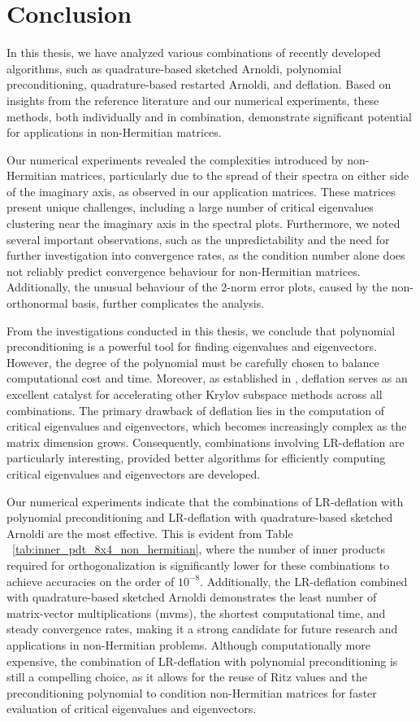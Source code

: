 \chapter{Conclusion}

In this thesis, we have analyzed various combinations of recently developed algorithms, such as quadrature-based sketched Arnoldi, polynomial preconditioning, quadrature-based restarted Arnoldi, and deflation. Based on insights from the reference literature and our numerical experiments, these methods, both individually and in combination, demonstrate significant potential for applications in non-Hermitian matrices.

Our numerical experiments revealed the complexities introduced by non-Hermitian matrices, particularly due to the spread of their spectra on either side of the imaginary axis, as observed in our application matrices. These matrices present unique challenges, including a large number of critical eigenvalues clustering near the imaginary axis in the spectral plots. Furthermore, we noted several important observations, such as the unpredictability and the need for further investigation into convergence rates, as the condition number alone does not reliably predict convergence behaviour for non-Hermitian matrices. Additionally, the unusual behaviour of the 2-norm error plots, caused by the non-orthonormal basis, further complicates the analysis.

From the investigations conducted in this thesis, we conclude that polynomial preconditioning is a powerful tool for finding eigenvalues and eigenvectors. However, the degree of the polynomial must be carefully chosen to balance computational cost and time. Moreover, as established in \cite{4}, deflation serves as an excellent catalyst for accelerating other Krylov subspace methods across all combinations. The primary drawback of deflation lies in the computation of critical eigenvalues and eigenvectors, which becomes increasingly complex as the matrix dimension grows. Consequently, combinations involving LR-deflation are particularly interesting, provided better algorithms for efficiently computing critical eigenvalues and eigenvectors are developed.

Our numerical experiments indicate that the combinations of LR-deflation with polynomial preconditioning and LR-deflation with quadrature-based sketched Arnoldi are the most effective. This is evident from Table ~\ref{tab:inner_pdt_8x4_non_hermitian}, where the number of inner products required for orthogonalization is significantly lower for these combinations to achieve accuracies on the order of $10^{-8}$. Additionally, the LR-deflation combined with quadrature-based sketched Arnoldi demonstrates the least number of matrix-vector multiplications (mvms), the shortest computational time, and steady convergence rates, making it a strong candidate for future research and applications in non-Hermitian problems. Although computationally more expensive, the combination of LR-deflation with polynomial preconditioning is still a compelling choice, as it allows for the reuse of Ritz values and the preconditioning polynomial to condition non-Hermitian matrices for faster evaluation of critical eigenvalues and eigenvectors.

